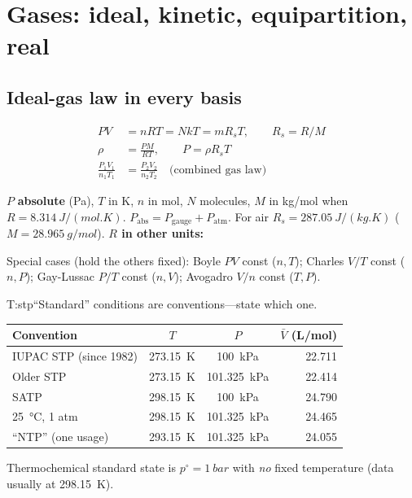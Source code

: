 \section{Gases: ideal, kinetic, equipartition, real}\label{sec:gases}
\begin{multicols}{2}
\subsection{Ideal-gas law in every basis}\label{sec:idealgas}
\CORE{}
\begin{formulabox}
\vspace{-6pt}
\begin{align}
PV &= nRT = NkT = mR_sT,\qquad R_s=R/M \label{F:gas:ideal}\\
\rho &= \frac{PM}{RT},\qquad P=\rho R_sT \label{F:gas:density}\\
\frac{P_1V_1}{n_1T_1} &= \frac{P_2V_2}{n_2T_2}\quad\text{(combined gas law)} \label{F:gas:combined}
\end{align}
\end{formulabox}
$P$ \textbf{absolute} (Pa), $T$ in K, $n$ in mol, $N$ molecules, $M$ in \si{kg/mol} when $R=\SI{8.314}{J/(mol.K)}$. $P_{\text{abs}}=P_{\text{gauge}}+P_{\text{atm}}$. For air $R_s=\SI{287.05}{J/(kg.K)}$ ($M=\SI{28.965}{g/mol}$). \textbf{$R$ in other units:} 

Special cases (hold the others fixed): Boyle $PV$ const ($n,T$); Charles $V/T$ const ($n,P$); Gay-Lussac $P/T$ const ($n,V$); Avogadro $V/n$ const ($T,P$).

\begin{reftab}{T:stp}{``Standard'' conditions are conventions---state which one.}
\small
\begin{tabularx}{\linewidth}{@{}Yccr@{}}
\toprule
Convention & $T$ & $P$ & $\bar V$ (\si{L/mol})\\
\midrule
IUPAC STP (since 1982) & \SI{273.15}{K} & \SI{100}{kPa} & 22.711\\
Older STP & \SI{273.15}{K} & \SI{101.325}{kPa} & 22.414\\
SATP & \SI{298.15}{K} & \SI{100}{kPa} & 24.790\\
\SI{25}{\celsius}, 1 atm & \SI{298.15}{K} & \SI{101.325}{kPa} & 24.465\\
``NTP'' (one usage) & \SI{293.15}{K} & \SI{101.325}{kPa} & 24.055\\
\bottomrule
\end{tabularx}\end{reftab}
Thermochemical standard state is $p^\circ=\SI{1}{bar}$ with \emph{no} fixed temperature (data usually at \SI{298.15}{K}).


\end{multicols}
